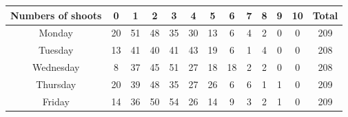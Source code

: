 \documentclass[a4paper]{article}
\begin{document}
\begin{table}[!htbp]
  \centering
    \begin{tabular}{|c|c|c|c|c|c|c|c|c|c|c|c|c|}
    \hline
    \rowcolor[rgb]{ .867,  .922,  .969} Numbers of shoots & 0     & 1     & 2     & 3     & 4     & 5     & 6     & 7     & 8     & 9     & 10    & Total \\
    \hline
    \rowcolor[rgb]{ .867,  .922,  .969} Monday & \cellcolor[rgb]{ 1,  1,  1}20 & \cellcolor[rgb]{ 1,  1,  1}51 & \cellcolor[rgb]{ 1,  1,  1}48 & \cellcolor[rgb]{ 1,  1,  1}35 & \cellcolor[rgb]{ 1,  1,  1}30 & \cellcolor[rgb]{ 1,  1,  1}13 & \cellcolor[rgb]{ 1,  1,  1}6 & \cellcolor[rgb]{ 1,  1,  1}4 & \cellcolor[rgb]{ 1,  1,  1}2 & \cellcolor[rgb]{ 1,  1,  1}0 & \cellcolor[rgb]{ 1,  1,  1}0 & 209 \\
    \hline
    \rowcolor[rgb]{ .867,  .922,  .969} Tuesday & \cellcolor[rgb]{ 1,  1,  1}13 & \cellcolor[rgb]{ 1,  1,  1}41 & \cellcolor[rgb]{ 1,  1,  1}40 & \cellcolor[rgb]{ 1,  1,  1}41 & \cellcolor[rgb]{ 1,  1,  1}43 & \cellcolor[rgb]{ 1,  1,  1}19 & \cellcolor[rgb]{ 1,  1,  1}6 & \cellcolor[rgb]{ 1,  1,  1}1 & \cellcolor[rgb]{ 1,  1,  1}4 & \cellcolor[rgb]{ 1,  1,  1}0 & \cellcolor[rgb]{ 1,  1,  1}0 & 208 \\
    \hline
    \rowcolor[rgb]{ .867,  .922,  .969} Wednesday & \cellcolor[rgb]{ 1,  1,  1}8 & \cellcolor[rgb]{ 1,  1,  1}37 & \cellcolor[rgb]{ 1,  1,  1}45 & \cellcolor[rgb]{ 1,  1,  1}51 & \cellcolor[rgb]{ 1,  1,  1}27 & \cellcolor[rgb]{ 1,  1,  1}18 & \cellcolor[rgb]{ 1,  1,  1}18 & \cellcolor[rgb]{ 1,  1,  1}2 & \cellcolor[rgb]{ 1,  1,  1}2 & \cellcolor[rgb]{ 1,  1,  1}0 & \cellcolor[rgb]{ 1,  1,  1}0 & 208 \\
    \hline
    \rowcolor[rgb]{ .867,  .922,  .969} Thursday & \cellcolor[rgb]{ 1,  1,  1}20 & \cellcolor[rgb]{ 1,  1,  1}39 & \cellcolor[rgb]{ 1,  1,  1}48 & \cellcolor[rgb]{ 1,  1,  1}35 & \cellcolor[rgb]{ 1,  1,  1}27 & \cellcolor[rgb]{ 1,  1,  1}26 & \cellcolor[rgb]{ 1,  1,  1}6 & \cellcolor[rgb]{ 1,  1,  1}6 & \cellcolor[rgb]{ 1,  1,  1}1 & \cellcolor[rgb]{ 1,  1,  1}1 & \cellcolor[rgb]{ 1,  1,  1}0 & 209 \\
    \hline
    \rowcolor[rgb]{ .867,  .922,  .969} Friday & \cellcolor[rgb]{ 1,  1,  1}14 & \cellcolor[rgb]{ 1,  1,  1}36 & \cellcolor[rgb]{ 1,  1,  1}50 & \cellcolor[rgb]{ 1,  1,  1}54 & \cellcolor[rgb]{ 1,  1,  1}26 & \cellcolor[rgb]{ 1,  1,  1}14 & \cellcolor[rgb]{ 1,  1,  1}9 & \cellcolor[rgb]{ 1,  1,  1}3 & \cellcolor[rgb]{ 1,  1,  1}2 & \cellcolor[rgb]{ 1,  1,  1}1 & \cellcolor[rgb]{ 1,  1,  1}0 & 209 \\

\end{tabular}
\end{table}
\end{document}
